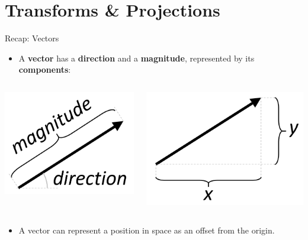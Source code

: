 \part{Transforms \& Projections}
\frame{\partpage}

\begin{frame}{Recap: Vectors}
	\begin{itemize}
		\pause\item A \textbf{vector} has a \textbf{direction} and a \textbf{magnitude}, represented by its \textbf{components}:
	\end{itemize}
	\pause\begin{columns}
		\begin{column}{0.45\textwidth}
			\includegraphics[width=\textwidth]{vector_polar}
		\end{column}
		\begin{column}{0.5\textwidth}
			\includegraphics[width=\textwidth]{vector_components}
		\end{column}
	\end{columns}	
	\begin{itemize}
		\pause\item A vector can represent a position in space as an offset from the origin.
	\end{itemize}
\end{frame}

